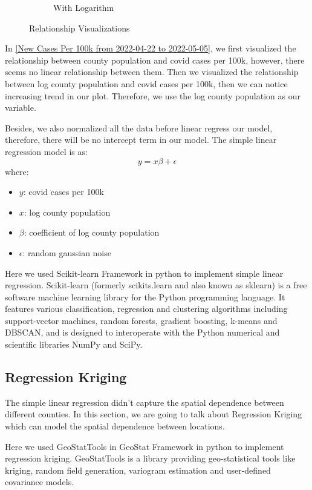 \documentclass{article}
\begin{document}
\begin{figure}[htbp]
\begin{subfigure}[b]{0.48\textwidth}
    \caption{With Logarithm}
\end{subfigure}
    \caption{Relationship Visualizations}
    \label{Relationship Visualizations}
\end{figure}

In \cref{New Cases Per 100k from 2022-04-22 to 2022-05-05}, we first visualized the relationship between county population and covid cases per 100k, however, there seems no linear relationship between them. Then we  visualized the relationship between log county population and covid cases per 100k, then we can notice increasing trend in our plot. Therefore, we use the log county population as our variable.

Besides, we also normalized all the data before linear regress our model, therefore, there will be no intercept term in our model. The simple linear regression model is as:
\begin{equation}
    y=x\beta+\epsilon
\end{equation}
where:
\begin{itemize}
    \item $y$: covid cases per 100k
    \item $x$: log county population
    \item $\beta$: coefficient of log county population
    \item $\epsilon$: random gaussian noise
\end{itemize}

Here we used Scikit-learn Framework in python to implement simple linear regression\cite{pedregosa2011scikit}.  Scikit-learn (formerly scikits.learn and also known as sklearn) is a free software machine learning library for the Python programming language. It features various classification, regression and clustering algorithms including support-vector machines, random forests, gradient boosting, k-means and DBSCAN, and is designed to interoperate with the Python numerical and scientific libraries NumPy and SciPy.
\subsection{Regression Kriging}
The simple linear regression didn't capture the spatial dependence between different counties. In this section, we are going to talk about Regression Kriging which can model the spatial dependence between locations.

Here we used GeoStatTools in GeoStat Framework in python to implement regression kriging\cite{muller2022gstools}.  GeoStatTools is a library providing geo-statistical tools like kriging, random field generation, variogram estimation and user-defined covariance models.
\end{document}
